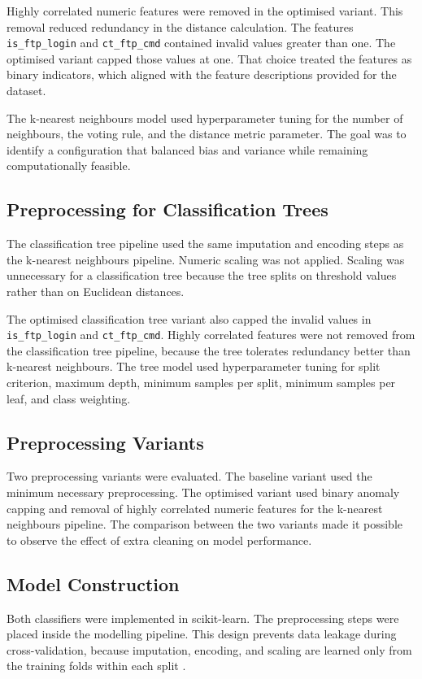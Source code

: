 \documentclass[conference,10pt]{IEEEtran}
\begin{document}
Highly correlated numeric features were removed in the optimised variant. This removal reduced redundancy in the distance calculation. The features \texttt{is\_ftp\_login} and \texttt{ct\_ftp\_cmd} contained invalid values greater than one. The optimised variant capped those values at one. That choice treated the features as binary indicators, which aligned with the feature descriptions provided for the dataset.

The k-nearest neighbours model used hyperparameter tuning for the number of neighbours, the voting rule, and the distance metric parameter. The goal was to identify a configuration that balanced bias and variance while remaining computationally feasible.

\subsection{Preprocessing for Classification Trees}
The classification tree pipeline used the same imputation and encoding steps as the k-nearest neighbours pipeline. Numeric scaling was not applied. Scaling was unnecessary for a classification tree because the tree splits on threshold values rather than on Euclidean distances.

The optimised classification tree variant also capped the invalid values in \texttt{is\_ftp\_login} and \texttt{ct\_ftp\_cmd}. Highly correlated features were not removed from the classification tree pipeline, because the tree tolerates redundancy better than k-nearest neighbours. The tree model used hyperparameter tuning for split criterion, maximum depth, minimum samples per split, minimum samples per leaf, and class weighting.

\subsection{Preprocessing Variants}
Two preprocessing variants were evaluated. The baseline variant used the minimum necessary preprocessing. The optimised variant used binary anomaly capping and removal of highly correlated numeric features for the k-nearest neighbours pipeline. The comparison between the two variants made it possible to observe the effect of extra cleaning on model performance.

\subsection{Model Construction}
Both classifiers were implemented in scikit-learn. The preprocessing steps were placed inside the modelling pipeline. This design prevents data leakage during cross-validation, because imputation, encoding, and scaling are learned only from the training folds within each split \cite{sklearn}.
\end{document}
